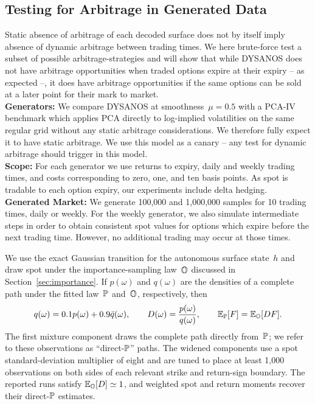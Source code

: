 \subsection{Testing for Arbitrage in Generated Data}
\label{sec:arbitrage}

Static absence of arbitrage of each decoded surface does not by itself imply
absence of dynamic arbitrage between trading times. We here brute-force test a subset of possible arbitrage-strategies and will show that
while DYSANOS does not have arbitrage opportunities when traded options expire at their expiry -- as expected --, it does have arbitrage opportunities
if the same options can be sold at a later point for their mark to market.\\

\noindent
\textbf{Generators:}
We compare DYSANOS at smoothness~$\mu=0.5$ with a PCA-IV benchmark which
applies PCA directly to log-implied volatilities on the same regular grid  without any static arbitrage considerations. We therefore fully expect
it to have static arbitrage. We use this model as a canary -- any test for dynamic arbitrage should trigger in this model.\\


\noindent
\textbf{Scope:}
For each generator we use returns to expiry,
daily and weekly trading times, and
costs
corresponding to zero, one, and ten basis points. As spot is tradable to each option expiry, our experiments
include delta hedging.\\

\noindent
\textbf{Generated Market:}
We generate 100,000 and 1,000,000 samples for 10 trading times, daily or weekly. For the weekly generator, we also simulate
intermediate steps in order to obtain consistent spot values for options which expire before the next trading time. However, no
additional trading may occur at those times.

We use
the exact Gaussian transition for the autonomous surface state~$h$ and draw
spot under the importance-sampling law~$\O$ discussed in
Section~\ref{sec:importance}. If $p(\omega)$ and $q(\omega)$ are the densities
of a complete path under the fitted law~$\P$ and~$\O$, respectively, then
\begin{equation}\label{eq:arbitrage_importance_mixture}
 q(\omega)=0.1p(\omega)+0.9\bar q(\omega),
 \qquad
 D(\omega)=\frac{p(\omega)}{q(\omega)},
 \qquad
 \E_\P[F]=\E_\O[DF].
\end{equation}
The first mixture component draws the complete path directly from~$\P$; we
refer to these observations as ``direct-$\P$'' paths. The widened components use
a spot standard-deviation multiplier of eight and are tuned to place at least
1,000 observations on both sides of each relevant strike and return-sign
boundary. The reported runs satisfy $\E_\O[D]\simeq1$, and weighted spot and
return moments recover their direct-$\P$ estimates.\\

